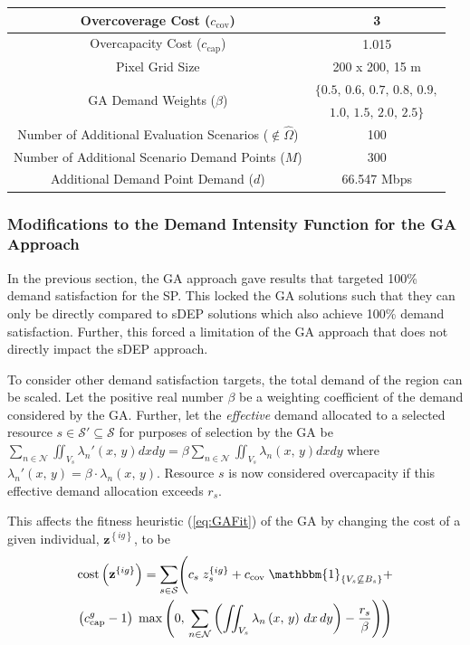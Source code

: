 \documentclass[12pt,dvipsnames]{report}
\newcommand{\ind}[1]{\mathbbm{1}_{\left\{ #1 \right\}}}
\begin{document}
\begin{table}[!htp]
\begin{tabular}{|c|c|}
		\hline 
		Overcoverage Cost ($c_\text{cov}$) & 3 \\
		\hline
		Overcapacity Cost ($c_\text{cap}$) & 1.015 \\ 
		\hline
		Pixel Grid Size & 200 x 200, 15 m \\ 
		\hline
		\multirow{2}{*}{GA Demand Weights ($\beta$)} & $\{ 0.5,\, 0.6,\, 0.7,\, 0.8,\, 0.9,$ \\
		& $1.0,\, 1.5,\, 2.0,\, 2.5 \}$ \\
		\hline
		\hline
		Number of Additional Evaluation Scenarios ($\not\in \hat{\Omega}$) & 100 \\
		\hline
		Number of Additional Scenario Demand Points ($M$) & 300 \\
		\hline
		Additional Demand Point Demand ($d$) & 66.547 Mbps \\
		\hline
	\end{tabular}
	\label{tab:CaseI_SimVal}
\end{table}

\subsubsection{Modifications to the Demand Intensity Function for the GA Approach}

In the previous section, the GA approach gave results that targeted 100\% demand satisfaction for the SP.  This locked the GA solutions such that they can only be directly compared to sDEP solutions which also achieve 100\% demand satisfaction.  Further, this forced a limitation of the GA approach that does not directly impact the sDEP approach.

To consider other demand satisfaction targets, the total demand of the region can be scaled.  Let the positive real number $\beta$ be a weighting coefficient of the demand considered by the GA.  Further, let the \emph{effective} demand allocated to a selected resource $s \in \mathcal{S}' \subseteq \mathcal{S}$ for purposes of selection by the GA be $\sum_{n \in \mathcal{N}} \iint_{V_s} \lambda_n'\left( x,\, y \right) dx dy = \beta \sum_{n \in \mathcal{N}} \iint_{V_s} \lambda_n\left( x,\, y \right) dx dy$ where $\lambda_n'\left( x,\, y \right) = \beta \cdot \lambda_n\left( x,\, y \right)$.  Resource $s$ is now considered overcapacity if this effective demand allocation exceeds $r_s$.

This affects the fitness heuristic (\cref{eq:GAFit}) of the GA by changing the cost of a given individual, $\textbf{z}^{\left\{ ig \right\}}$, to be
\begin{multline} \label{eq:GAModifiedCost}
\mathrm{cost}\left( \textbf{z}^{\left\{ ig \right\}} \right) = \sum_{s \in \mathcal{S}} \Biggl( c_s \; z_s^{\left\{ ig \right\}} + c_\text{cov} \; \ind{V_s \not\subseteq B_s} + \\ \left( c_\text{cap}^g - 1 \right) \; \max\left( 0,\, \sum_{n \in \mathcal{N}} \left( \iint_{V_s} \lambda_n\left( x,\, y \right)\, dx\, dy \right) - \frac{r_s}{\beta} \right) \Biggr)
\end{multline}
\end{document}
